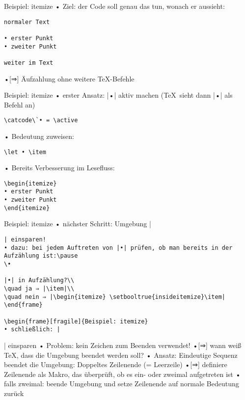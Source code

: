 \documentclass[t]{beamer}
\begin{document}
\begin{frame}[fragile]{Beispiel: itemize}
• Ziel: der Code soll genau das tun, wonach er aussieht:
\begin{verbatim}
normaler Text

• erster Punkt
• zweiter Punkt

weiter im Text
\end{verbatim}
•[⇒] Äufzahlung ohne weitere \TeX-Befehle
\•
\end{frame}

\begin{frame}[fragile]{Beispiel: itemize}
• erster Ansatz: |•| aktiv machen (\TeX\ sieht dann |•| als Befehl an)
\begin{verbatim}
\catcode\`• = \active
\end{verbatim}
\pause
• Bedeutung zuweisen:
\begin{verbatim}
\let • \item
\end{verbatim}
\pause
• Bereits Verbesserung im Lesefluss:
\begin{verbatim}
\begin{itemize}
• erster Punkt
• zweiter Punkt
\end{itemize}
\end{verbatim}
\•
\end{frame}

\begin{frame}[fragile]{Beispiel: itemize}
• nächster Schritt: Umgebung |\begin{verbatim}| einsparen!
• dazu: bei jedem Auftreten von |•| prüfen, ob man bereits in der Aufzählung ist:\pause
\•

|•| in Aufzählung?\\
\quad ja ⇒ |\item|\\
\quad nein ⇒ |\begin{itemize} \setbooltrue{insideitemize}\item| 
\end{frame}

\begin{frame}[fragile]{Beispiel: itemize}
• schließlich: |\end{verbatim}| einsparen
• Problem: kein Zeichen zum Beenden verwendet!
•[⇒] wann weiß \TeX, dass die Umgebung beendet werden soll?\pause
• Ansatz: Eindeutige Sequenz beendet die Umgebung: Doppeltes Zeilenende (= Leerzeile)
•[⇒] definiere Zeilenende als Makro, das überprüft, ob es ein- oder zweimal aufgetreten ist
• falls zweimal: beende Umgebung und setze Zeilenende auf normale Bedeutung zurück
\•
\end{frame}
\end{document}
